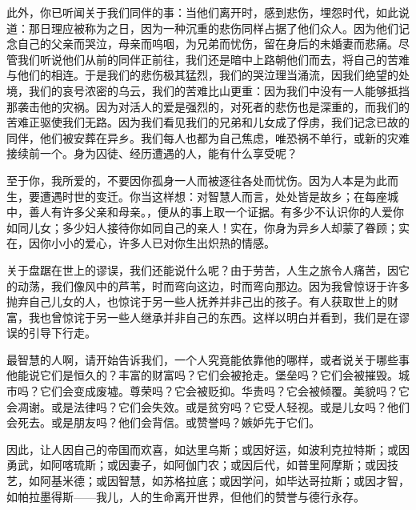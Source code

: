 此外，你已听闻关于我们同伴的事：当他们离开时，感到悲伤，埋怨时代，如此说道：那日理应被称为之日，因为一种沉重的悲伤同样占据了他们众人。因为他们记念自己的父亲而哭泣，母亲而呜咽，为兄弟而忧伤，留在身后的未婚妻而悲痛。尽管我们听说他们从前的同伴正前往，我们还是暗中上路朝他们而去，将自己的苦难与他们的相连。于是我们的悲伤极其猛烈，我们的哭泣理当涌流，因我们绝望的处境，我们的哀号浓密的乌云，我们的苦难比山更重：因为我们中没有一人能够抵挡那袭击他的灾祸。因为对活人的爱是强烈的，对死者的悲伤也是深重的，而我们的苦难正驱使我们无路。因为我们看见我们的兄弟和儿女成了俘虏，我们记念已故的同伴，他们被安葬在异乡。我们每人也都为自己焦虑，唯恐祸不单行，或新的灾难接续前一个。身为囚徒、经历遭遇的人，能有什么享受呢？\par

至于你，我所爱的，不要因你孤身一人而被逐往各处而忧伤。因为人本是为此而生，要遭遇时世的变迁。你当这样想：对智慧人而言，处处皆是故乡；在每座城中，善人有许多父亲和母亲。，便从的事上取一个证据。有多少不认识你的人爱你如同儿女；多少妇人接待你如同自己的亲人！实在，你身为异乡人却蒙了眷顾；实在，因你小小的爱心，许多人已对你生出炽热的情感。\par

关于盘踞在世上的谬误，我们还能说什么呢？由于劳苦，人生之旅令人痛苦，因它的动荡，我们像风中的芦苇，时而弯向这边，时而弯向那边。因为我曾惊讶于许多抛弃自己儿女的人，也惊诧于另一些人抚养并非己出的孩子。有人获取世上的财富，我也曾惊诧于另一些人继承并非自己的东西。这样以明白并看到，我们是在谬误的引导下行走。\newline{}\par

最智慧的人啊，请开始告诉我们，一个人究竟能依靠他的哪样，或者说关于哪些事他能说它们是恒久的？丰富的财富吗？它们会被抢走。堡垒吗？它们会被摧毁。城市吗？它们会变成废墟。尊荣吗？它会被贬抑。华贵吗？它会被倾覆。美貌吗？它会凋谢。或是法律吗？它们会失效。或是贫穷吗？它受人轻视。或是儿女吗？他们会死去。或是朋友吗？他们会背信。或赞誉吗？嫉妒先于它们。\newline{}\par

因此，让人因自己的帝国而欢喜，如达里乌斯；或因好运，如波利克拉特斯；或因勇武，如阿喀琉斯；或因妻子，如阿伽门农；或因后代，如普里阿摩斯；或因技艺，如阿基米德；或因智慧，如苏格拉底；或因学问，如毕达哥拉斯；或因才智，如帕拉墨得斯——我儿，人的生命离开世界，但他们的赞誉与德行永存。\newline{}\par


